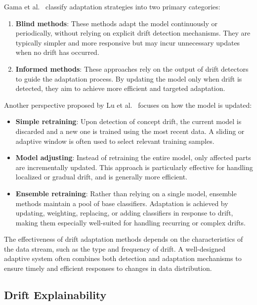 Gama et al.~\cite{drift_adaptation_survey} classify adaptation strategies into
two primary categories:

\begin{enumerate}
    \item \textbf{Blind methods}: These methods adapt the model continuously or
          periodically, without relying on explicit drift detection mechanisms.
          They are typically simpler and more responsive but may incur unnecessary
          updates when no drift has occurred.
    \item \textbf{Informed methods}: These approaches rely on the output of drift
          detectors to guide the adaptation process. By updating the model only when drift
          is detected, they aim to achieve more efficient and targeted adaptation.
\end{enumerate}

Another perspective proposed by Lu et al.~\cite{learning_under_concept_drift}
focuses on how the model is updated:

\begin{itemize}
    \item \textbf{Simple retraining}: Upon detection of concept drift, the
          current model is discarded and a new one is trained using the most recent
          data. A sliding or adaptive window is often used to select relevant training
          samples.
    \item \textbf{Model adjusting}: Instead of retraining the entire model,
          only affected parts are incrementally updated. This approach is particularly
          effective for handling localized or gradual drift, and is generally more
          efficient.
    \item \textbf{Ensemble retraining}: Rather than relying on a single model,
          ensemble methods maintain a pool of base classifiers. Adaptation is achieved
          by updating, weighting, replacing, or adding classifiers in response to drift,
          making them especially well-suited for handling recurring or complex drifts.
\end{itemize}

The effectiveness of drift adaptation methods depends on the characteristics of
the data stream, such as the type and frequency of drift. A well-designed
adaptive system often combines both detection and adaptation mechanisms to
ensure timely and efficient responses to changes in data distribution.

\subsection*{Drift Explainability}\label{subsec:drift_explainability}

